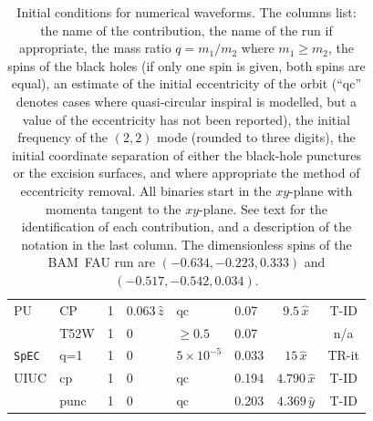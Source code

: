 \begin{table}
\begin{center}
\begin{tabular}{|l|l|l|l|l|l|c|c|}
PU\hfill\cite{Pretorius:2004jg,Pretorius:2005gq}  & CP \cite{Buonanno:2006ui}    & 1 & $0.063\,\hat z$      & qc  &
0.07  & $9.5\,\hat x$ & T-ID \cite{Cook:2004kt} \\
              & T52W \cite{Pretorius:2007jn}  & 1 & $0$       & $\ge
              0.5$ & 0.07 & & n/a \\[1em]

{\tt SpEC}\hfill  \cite{Scheel:2006gg}        & q=1 \cite{Boyle:2007ft,Scheel:2008rj}       & 1 & $0$       & $5\times 10^{-5}$  &
0.033 & $15\,\hat x$ & TR-it \cite{Pfeiffer:2007yz} \\[1em]

UIUC \hfill\cite{Etienne:2007hr}          & cp \cite{Etienne:2007hr}     & 1 & $0$       & qc  &
0.194 & $4.790\,\hat x$ & T-ID \cite{Cook:2004kt} \\ 
             & punc \cite{Etienne:2007hr}   & 1 & $0$     & qc  &
              0.203 & $4.369\,\hat y$ & T-ID \cite{Tichy:2003qi} \\  \hline
\end{tabular}
\end{center}
\caption[Initial conditions for numerical waveforms.]{
\label{tab:allwaveforms}
Initial conditions for numerical waveforms.
The columns list: 
the name of the contribution, the name of the run
if appropriate, 
the mass ratio $q=m_1/m_2$ where $m_1\ge m_2$, the
spins of the black holes (if only one spin is given, both spins are equal), an estimate of the initial
eccentricity of the orbit (``qc'' denotes cases where quasi-circular inspiral 
is modelled, but a value of the eccentricity has not been reported), the initial frequency of the $(2,2)$
mode (rounded to three digits), the initial coordinate separation
of either the black-hole punctures or the excision surfaces, and where
appropriate the method of eccentricity removal.  All binaries start
 in the $xy$-plane with momenta tangent to the $xy$-plane.  See text for the
identification of each contribution, and a description of the notation
in the last column. 
The dimensionless spins of the BAM~FAU run are $(-0.634,-0.223, 0.333)$ and 
$(-0.517,-0.542,0.034)$.}
\end{table}




